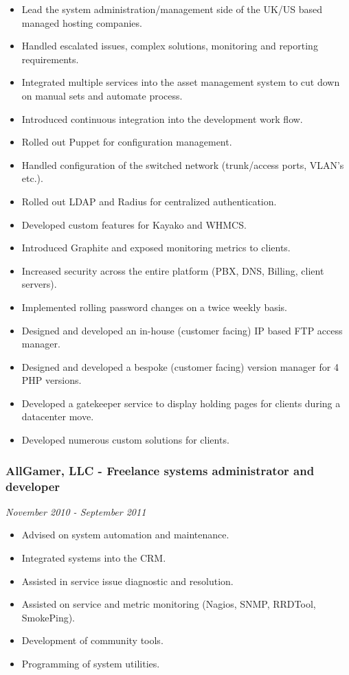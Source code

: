 \begin{itemize}
\itemsep1pt\parskip0pt
\item
  Lead the system administration/management side of the UK/US based
  managed hosting companies.
\item
  Handled escalated issues, complex solutions, monitoring and reporting
  requirements.
\item
  Integrated multiple services into the asset management system to cut
  down on manual sets and automate process.
\item
  Introduced continuous integration into the development work flow.
\item
  Rolled out Puppet for configuration management.
\item
  Handled configuration of the switched network (trunk/access ports,
  VLAN's etc.).
\item
  Rolled out LDAP and Radius for centralized authentication.
\item
  Developed custom features for Kayako and WHMCS.
\item
  Introduced Graphite and exposed monitoring metrics to clients.
\item
  Increased security across the entire platform (PBX, DNS, Billing,
  client servers).
\item
  Implemented rolling password changes on a twice weekly basis.
\item
  Designed and developed an in-house (customer facing) IP based FTP
  access manager.
\item
  Designed and developed a bespoke (customer facing) version manager for
  4 PHP versions.
\item
  Developed a gatekeeper service to display holding pages for clients
  during a datacenter move.
\item
  Developed numerous custom solutions for clients.
\end{itemize}

\subsubsection{AllGamer, LLC - Freelance systems administrator and
developer}\label{allgamer-llc---freelance-systems-administrator-and-developer}

\emph{November 2010 - September 2011}

\begin{itemize}
\itemsep1pt\parskip0pt
\item
  Advised on system automation and maintenance.
\item
  Integrated systems into the CRM.
\item
  Assisted in service issue diagnostic and resolution.
\item
  Assisted on service and metric monitoring (Nagios, SNMP, RRDTool,
  SmokePing).
\item
  Development of community tools.
\item
  Programming of system utilities.
\end{itemize}

